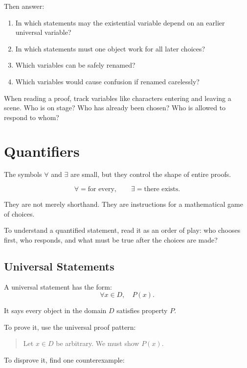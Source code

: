 Then answer:

\begin{enumerate}
\item In which statements may the existential variable depend on an earlier universal variable?
\item In which statements must one object work for all later choices?
\item Which variables can be safely renamed?
\item Which variables would cause confusion if renamed carelessly?
\end{enumerate}

\begin{walkbox}
When reading a proof, track variables like characters entering and leaving a scene. Who is on stage? Who has already been chosen? Who is allowed to respond to whom?
\end{walkbox}

\section{Quantifiers}

The symbols $\forall$ and $\exists$ are small, but they control the shape of entire proofs.

\[
\forall=\text{for every},\qquad \exists=\text{there exists}.
\]

They are not merely shorthand. They are instructions for a mathematical game of choices.

\begin{focusbox}
To understand a quantified statement, read it as an order of play: who chooses first, who responds, and what must be true after the choices are made?
\end{focusbox}

\subsection{Universal Statements}

A universal statement has the form:
\[
\forall x\in D,\quad P(x).
\]

It says every object in the domain $D$ satisfies property $P$.

To prove it, use the universal proof pattern:

\begin{quote}
Let $x\in D$ be arbitrary. We must show $P(x)$.
\end{quote}

To disprove it, find one counterexample:

